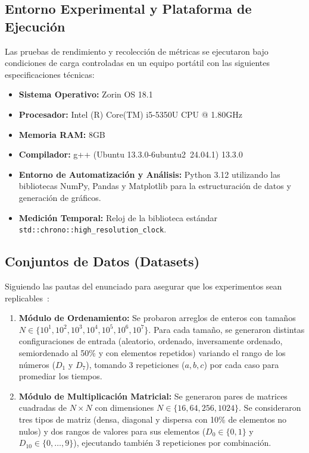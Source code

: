 \subsection{Entorno Experimental y Plataforma de Ejecución}
Las pruebas de rendimiento y recolección de métricas se ejecutaron bajo condiciones de carga controladas en un equipo portátil con las siguientes especificaciones técnicas:
\begin{itemize}
    \item \textbf{Sistema Operativo:} Zorin OS 18.1
    \item \textbf{Procesador:}  Intel (R) Core(TM) i5-5350U CPU @ 1.80GHz
    \item \textbf{Memoria RAM:} 8GB
    \item \textbf{Compilador:}  g++ (Ubuntu 13.3.0-6ubuntu2~24.04.1) 13.3.0
    \item \textbf{Entorno de Automatización y Análisis:} Python 3.12 utilizando las bibliotecas NumPy, Pandas y Matplotlib para la estructuración de datos y generación de gráficos.
    \item \textbf{Medición Temporal:} Reloj de la biblioteca estándar \texttt{std::chrono::high\_resolution\_clock}.
\end{itemize}

\subsection{Conjuntos de Datos (Datasets)}
Siguiendo las pautas del enunciado para asegurar que los experimentos sean replicables~\cite{hales2017replicability}:
\begin{enumerate}
    \item \textbf{Módulo de Ordenamiento:} Se probaron arreglos de enteros con tamaños $N \in \{10^1, 10^2, 10^3, 10^4, 10^5, 10^6, 10^7\}$. Para cada tamaño, se generaron distintas configuraciones de entrada (aleatorio, ordenado, inversamente ordenado, semiordenado al 50\% y con elementos repetidos) variando el rango de los números ($D_1$ y $D_7$), tomando 3 repeticiones ($a, b, c$) por cada caso para promediar los tiempos.
    \item \textbf{Módulo de Multiplicación Matricial:} Se generaron pares de matrices cuadradas de $N \times N$ con dimensiones $N \in \{16, 64, 256, 1024\}$. Se consideraron tres tipos de matriz (densa, diagonal y dispersa con 10\% de elementos no nulos) y dos rangos de valores para sus elementos ($D_0 \in \{0, 1\}$ y $D_{10} \in \{0, \dots, 9\}$), ejecutando también 3 repeticiones por combinación.
\end{enumerate}